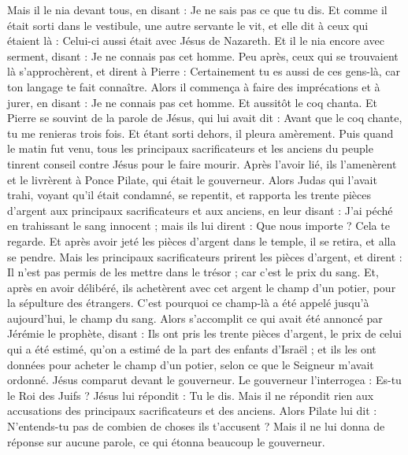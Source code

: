 \begin{multicols}{2}
Mais il le nia devant tous, en disant : Je ne sais pas ce que tu dis.
Et comme il était sorti dans le vestibule, une autre servante le vit, et elle dit à ceux qui étaient là : Celui-ci aussi était avec Jésus de Nazareth.
Et il le nia encore avec serment, disant : Je ne connais pas cet homme.
Peu après, ceux qui se trouvaient là s'approchèrent, et dirent à Pierre : Certainement tu es aussi de ces gens-là, car ton langage te fait connaître.
Alors il commença à faire des imprécations et à jurer, en disant : Je ne connais pas cet homme. Et aussitôt le coq chanta.
Et Pierre se souvint de la parole de Jésus, qui lui avait dit : Avant que le coq chante, tu me renieras trois fois. Et étant sorti dehors, il pleura amèrement.
\VerseOne{}Puis quand le matin fut venu, tous les principaux sacrificateurs et les anciens du peuple tinrent conseil contre Jésus pour le faire mourir.
Après l'avoir lié, ils l'amenèrent et le livrèrent à Ponce Pilate, qui était le gouverneur.
Alors Judas qui l'avait trahi, voyant qu'il était condamné, se repentit, et rapporta les trente pièces d'argent aux principaux sacrificateurs et aux anciens,
en leur disant : J'ai péché en trahissant le sang innocent ; mais ils lui dirent : Que nous importe ? Cela te regarde.
Et après avoir jeté les pièces d'argent dans le temple, il se retira, et alla se pendre.
Mais les principaux sacrificateurs prirent les pièces d'argent, et dirent : Il n'est pas permis de les mettre dans le trésor ; car c'est le prix du sang.
Et, après en avoir délibéré, ils achetèrent avec cet argent le champ d'un potier, pour la sépulture des étrangers.
C'est pourquoi ce champ-là a été appelé jusqu'à aujourd'hui, le champ du sang.
Alors s'accomplit ce qui avait été annoncé par Jérémie le prophète, disant : Ils ont pris les trente pièces d'argent, le prix de celui qui a été estimé, qu'on a estimé de la part des enfants d'Israël ;
et ils les ont données pour acheter le champ d'un potier, selon ce que le Seigneur m'avait ordonné.
Jésus comparut devant le gouverneur. Le gouverneur l'interrogea : Es-tu le Roi des Juifs ? Jésus lui répondit : Tu le dis.
Mais il ne répondit rien aux accusations des principaux sacrificateurs et des anciens.
Alors Pilate lui dit : N'entends-tu pas de combien de choses ils t'accusent ?
Mais il ne lui donna de réponse sur aucune parole, ce qui étonna beaucoup le gouverneur.

\end{multicols}
